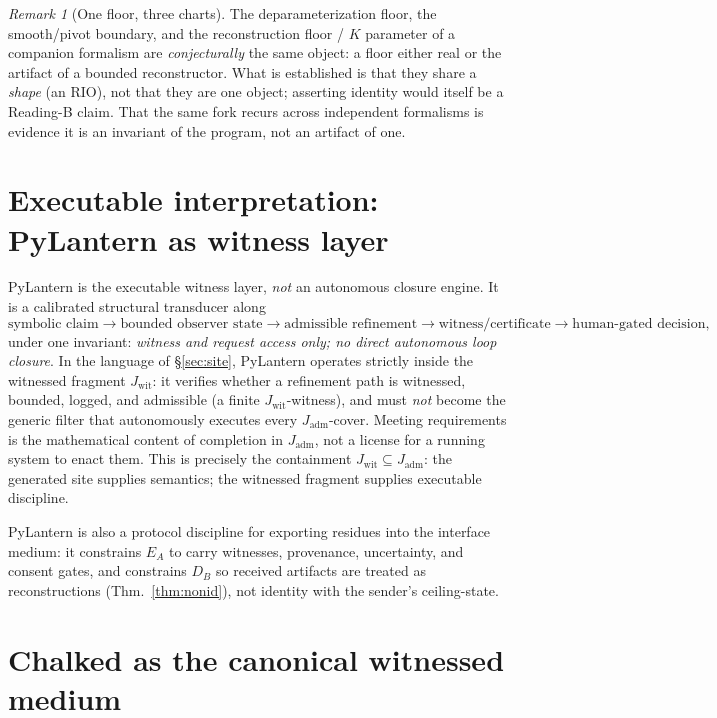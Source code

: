 \documentclass[11pt]{article}
\theoremstyle{definition}
\theoremstyle{remark}
\newtheorem*{remark}{Remark}
\newcommand{\Jadm}{J_{\mathrm{adm}}}
\newcommand{\Jwit}{J_{\mathrm{wit}}}
\begin{document}
\begin{remark}[One floor, three charts]
The deparameterization floor, the smooth/pivot boundary, and the reconstruction floor / $K$ parameter
of a companion formalism are \emph{conjecturally} the same object: a floor either real or the artifact
of a bounded reconstructor. What is established is that they share a \emph{shape} (an RIO), not that
they are one object; asserting identity would itself be a Reading-B claim. That the same fork recurs
across independent formalisms is evidence it is an invariant of the program, not an artifact of one.
\end{remark}

\section{Executable interpretation: PyLantern as witness layer}\label{sec:pylantern}

PyLantern is the executable witness layer, \emph{not} an autonomous closure engine. It is a calibrated
structural transducer along
\[
  \text{symbolic claim} \to \text{bounded observer state} \to \text{admissible refinement}
  \to \text{witness/certificate} \to \text{human-gated decision},
\]
under one invariant: \emph{witness and request access only; no direct autonomous loop closure}.
In the language of \S\ref{sec:site}, PyLantern operates strictly inside the witnessed fragment
$\Jwit$: it verifies whether a refinement path is witnessed, bounded, logged, and admissible (a finite
$\Jwit$-witness), and must \emph{not} become the generic filter that autonomously executes every
$\Jadm$-cover. Meeting requirements is the mathematical content of completion in $\Jadm$, not a license
for a running system to enact them. This is precisely the containment $\Jwit\subseteq\Jadm$: the
generated site supplies semantics; the witnessed fragment supplies executable discipline.

PyLantern is also a protocol discipline for exporting residues into the interface medium: it
constrains $E_A$ to carry witnesses, provenance, uncertainty, and consent gates, and constrains $D_B$
so received artifacts are treated as reconstructions (Thm.~\ref{thm:nonid}), not identity with the
sender's ceiling-state.

\section{Chalked as the canonical witnessed medium}\label{sec:chalked}
\end{document}
